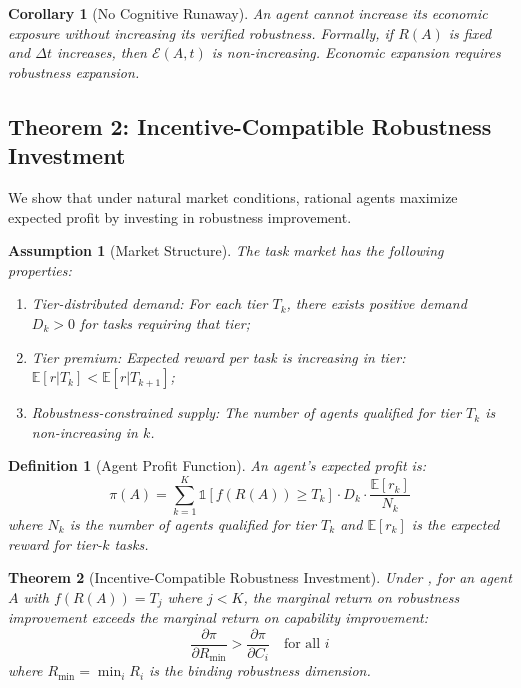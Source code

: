 \documentclass[11pt,a4paper]{article}
\newtheorem{theorem}{Theorem}
\newtheorem{corollary}[theorem]{Corollary}
\newtheorem{definition}{Definition}
\newtheorem{assumption}{Assumption}
\newcommand{\E}{\mathbb{E}}
\begin{document}
\begin{corollary}[No Cognitive Runaway]
\label{cor:runaway}
An agent cannot increase its economic exposure without increasing its verified robustness. Formally, if $R(A)$ is fixed and $\Delta t$ increases, then $\mathcal{E}(A, t)$ is non-increasing. Economic expansion requires robustness expansion.
\end{corollary}

\subsection{Theorem 2: Incentive-Compatible Robustness Investment}

We show that under natural market conditions, rational agents maximize expected profit by investing in robustness improvement.

\begin{assumption}[Market Structure]
\label{asm:market}
The task market has the following properties:
\begin{enumerate}[nosep,label=(\alph*)]
  \item \emph{Tier-distributed demand:} For each tier $T_k$, there exists positive demand $D_k > 0$ for tasks requiring that tier;
  \item \emph{Tier premium:} Expected reward per task is increasing in tier: $\E[r | T_k] < \E[r | T_{k+1}]$;
  \item \emph{Robustness-constrained supply:} The number of agents qualified for tier $T_k$ is non-increasing in $k$.
\end{enumerate}
\end{assumption}

\begin{definition}[Agent Profit Function]
An agent's expected profit is:
\begin{equation}
  \pi(A) = \sum_{k=1}^{K} \mathbb{1}[f(R(A)) \geq T_k] \cdot D_k \cdot \frac{\E[r_k]}{N_k}
  \label{eq:profit}
\end{equation}
where $N_k$ is the number of agents qualified for tier $T_k$ and $\E[r_k]$ is the expected reward for tier-$k$ tasks.
\end{definition}

\begin{theorem}[Incentive-Compatible Robustness Investment]
\label{thm:incentive}
Under , for an agent $A$ with $f(R(A)) = T_j$ where $j < K$, the marginal return on robustness improvement exceeds the marginal return on capability improvement:
\begin{equation}
  \frac{\partial \pi}{\partial R_{\min}} > \frac{\partial \pi}{\partial C_i} \quad \text{for all } i
\end{equation}
where $R_{\min} = \min_i R_i$ is the binding robustness dimension.
\end{theorem}
\end{document}
